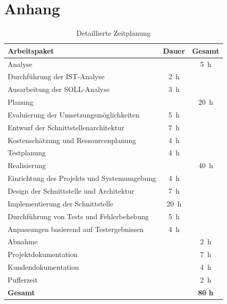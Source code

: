 \section*{Anhang}

\begin{table}[H]
  \centering
  \begin{tabular}{l c c}
    \hline
    \textbf{Arbeitspaket} & \textbf{Dauer} & \textbf{Gesamt} \\
    \hline
    Analyse                                              &                & \qty{5}{\hour} \\
    \quad Durchführung der IST-Analyse                   & \qty{2}{\hour}  &  \\
    \quad Ausarbeitung der SOLL-Analyse                  & \qty{3}{\hour}  &  \\
    Planung                                              &                & \qty{20}{\hour} \\
    \quad Evaluierung der Umsetzungsmöglichkeiten        & \qty{5}{\hour}  &  \\
    \quad Entwurf der Schnittstellenarchitektur          & \qty{7}{\hour}  &  \\
    \quad Kostenschätzung und Ressourcenplanung          & \qty{4}{\hour}  &  \\
    \quad Testplanung                                    & \qty{4}{\hour}  &  \\
    Realisierung                                         &                & \qty{40}{\hour} \\
    \quad Einrichtung des Projekts und Systemumgebung    & \qty{4}{\hour}  &  \\
    \quad Design der Schnittstelle und Architektur       & \qty{7}{\hour}  &  \\
    \quad Implementierung der Schnittstelle              & \qty{20}{\hour} &  \\
    \quad Durchführung von Tests und Fehlerbehebung      & \qty{5}{\hour}  &  \\
    \quad Anpassungen basierend auf Testergebnissen      & \qty{4}{\hour}  &  \\
    Abnahme                                              &                & \qty{2}{\hour} \\
    Projektdokumentation                                 &                & \qty{7}{\hour} \\
    Kundendokumentation                                  &                & \qty{4}{\hour} \\
    Pufferzeit                                           &                & \qty{2}{\hour} \\
    \hline
    \textbf{Gesamt} &  & \textbf{80 h} \\
    \hline
  \end{tabular}
  \caption{Detaillierte Zeitplanung}
  \label{tab:genaue-zeitplanung}
\end{table}

